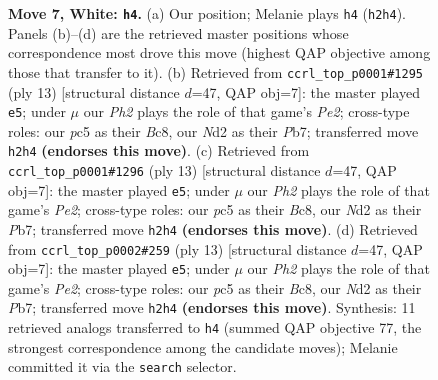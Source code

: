 \documentclass[11pt]{article}
\begin{document}
\begin{figure}[p]
\caption{\textbf{Move 7, White: \texttt{h4}.} (a) Our position; Melanie plays \texttt{h4} (\texttt{h2h4}). Panels (b)--(d) are the retrieved master positions whose correspondence most drove this move (highest QAP objective among those that transfer to it). (b) Retrieved from \texttt{ccrl\_top\_p0001\#1295} (ply 13) [structural distance $d$=47, QAP obj=7]: the master played \texttt{e5}; under $\mu$ our \emph{Ph2} plays the role of that game's \emph{Pe2}; cross-type roles: our \emph{p}c5 as their \emph{B}c8, our \emph{N}d2 as their \emph{P}b7; transferred move \texttt{h2h4} \textbf{(endorses this move)}. (c) Retrieved from \texttt{ccrl\_top\_p0001\#1296} (ply 13) [structural distance $d$=47, QAP obj=7]: the master played \texttt{e5}; under $\mu$ our \emph{Ph2} plays the role of that game's \emph{Pe2}; cross-type roles: our \emph{p}c5 as their \emph{B}c8, our \emph{N}d2 as their \emph{P}b7; transferred move \texttt{h2h4} \textbf{(endorses this move)}. (d) Retrieved from \texttt{ccrl\_top\_p0002\#259} (ply 13) [structural distance $d$=47, QAP obj=7]: the master played \texttt{e5}; under $\mu$ our \emph{Ph2} plays the role of that game's \emph{Pe2}; cross-type roles: our \emph{p}c5 as their \emph{B}c8, our \emph{N}d2 as their \emph{P}b7; transferred move \texttt{h2h4} \textbf{(endorses this move)}. Synthesis: 11 retrieved analogs transferred to \texttt{h4} (summed QAP objective 77, the strongest correspondence among the candidate moves); Melanie committed it via the \texttt{search} selector.}
\label{fig:thought-m12}
\end{figure}

\clearpage
\end{document}
